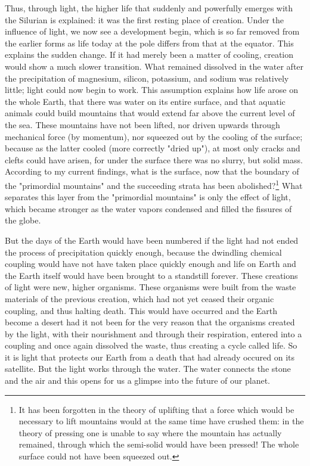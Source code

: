 \documentclass[a4paper, 12pt, oneside]{article}
\begin{document}
Thus, through light, the higher life that suddenly and powerfully emerges with the Silurian is explained: it was the first resting place of creation. Under the influence of light, we now see a development begin, which is so far removed from the earlier forms as life today at the pole differs from that at the equator. This explains the sudden change. If it had merely been a matter of cooling, creation would show a much slower transition. What remained dissolved in the water after the precipitation of magnesium, silicon, potassium, and sodium was relatively little; light could now begin to work. This assumption explains how life arose on the whole Earth, that there was water on its entire surface, and that aquatic animals could build mountains that would extend far above the current level of the sea. These mountains have not been lifted, nor driven upwards through mechanical force (by momentum), nor squeezed out by the cooling of the surface; because as the latter cooled (more correctly "dried up"), at most only cracks and clefts could have arisen, for under the surface there was no slurry, but solid mass. According to my current findings, what is the surface, now that the boundary of the "primordial mountains" and the succeeding strata has been abolished?\footnote{It has been forgotten in the theory of uplifting that a force which would be necessary to lift mountains would at the same time have crushed them: in the theory of pressing one is unable to say where the mountain has actually remained, through which the semi-solid would have been pressed! The whole surface could not have been squeezed out.} What separates this layer from the "primordial mountains" is only the effect of light, which became stronger as the water vapors condensed and filled the fissures of the globe.

But the days of the Earth would have been numbered if the light had not ended the process of precipitation quickly enough, because the dwindling chemical coupling would have not have taken place quickly enough and life on Earth and the Earth itself would have been brought to a standstill forever. These creations of light were new, higher organisms. These organisms were built from the waste materials of the previous creation, which had not yet ceased their organic coupling, and thus halting death. This would have occurred and the Earth become a desert had it not been for the very reason that the organisms created by the light, with their nourishment and through their respiration, entered into a coupling and once again dissolved the waste, thus creating a cycle called life. So it is light that protects our Earth from a death that had already occured on its satellite. But the light works through the water. The water connects the stone and the air and this opens for us a glimpse into the future of our planet.
\clearpage
\end{document}
